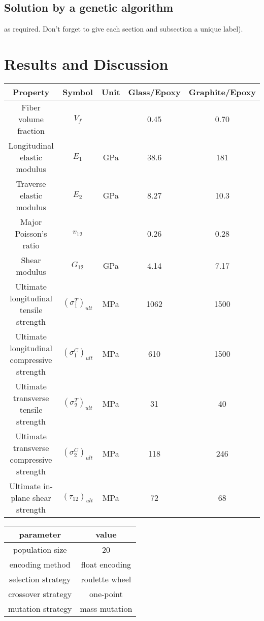 \documentclass[smallextended]{svjour3}       %
\begin{document}
\subsection{Solution by a genetic algorithm}\label{sec:2}
as required. Don't forget to give each section
and subsection a unique label).




\section{Results and Discussion}

\begin{tabular}{ccccc}
	\toprule
	Property								  & Symbol	   & Unit &  Glass/Epoxy &  Graphite/Epoxy  \\
	\midrule
	Fiber volume fraction					  & $V_f$		      &      &  0.45        &  0.70   \\
	Longitudinal elastic modulus			  & $E_1$		      & GPa  &  38.6        &  181  \\
	Traverse elastic modulus				  & $E_2$		      & GPa  &  8.27        &  10.3  \\
	Major Poisson's ratio					  & $v_{12}$	      &      &  0.26        &  0.28  \\
	Shear modulus							  & $G_{12}$	      & GPa  &  4.14        &  7.17  \\
	Ultimate longitudinal tensile strength    &  $(\sigma_1^T)_{ult}$ & MPa  &  1062        &  1500  \\
	Ultimate longitudinal compressive strength & $(\sigma_1^C)_{ult}$ & MPa  &  610        &  1500  \\
	Ultimate transverse tensile strength    &  $(\sigma_2^T)_{ult}$ & MPa  &  31        &  40 \\
	Ultimate transverse compressive strength & $(\sigma_2^C)_{ult}$ & MPa  &  118        &  246\\
	Ultimate in-plane shear strength          & $(\tau_{12})_{ult}$ & MPa  &  72&  68\\
	\bottomrule
\end{tabular}



\begin{tabular}{cc}
	\toprule
	parameter & value \\
	\midrule
	population size      & 20               \\
    encoding method      & float encoding  \\
	selection strategy   & roulette wheel  \\
	crossover strategy   & one-point \\
	mutation strategy    & mass mutation   \\
	\bottomrule
\end{tabular}
\end{document}

